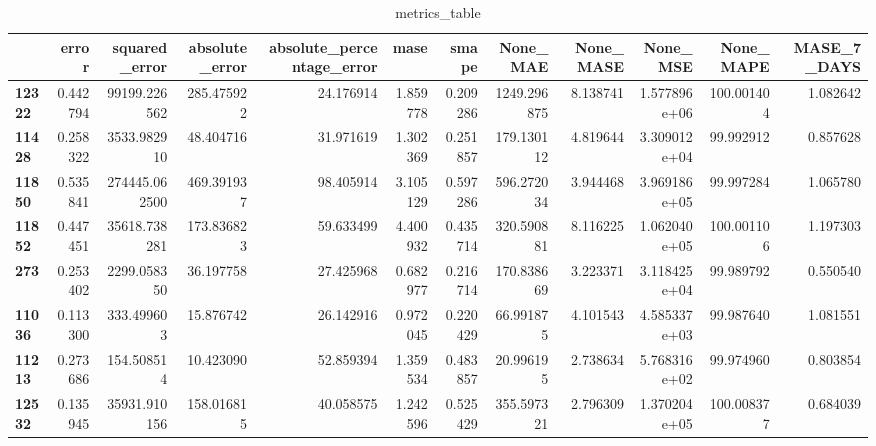 \begin{table}[h]
\centering
\caption{metrics_table}
\label{table:Final tune for dataset seasonal lstm local univariate, with differencing. After smape fix}
\begin{tabular}{lrrrrrrrrrrr}
\toprule
{} &     error &  squared\_error &  absolute\_error &  absolute\_percentage\_error &      mase &     smape &     None\_MAE &  None\_MASE &      None\_MSE &   None\_MAPE &  MASE\_7\_DAYS \\
\midrule
\textbf{12322} &  0.442794 &   99199.226562 &      285.475922 &                  24.176914 &  1.859778 &  0.209286 &  1249.296875 &   8.138741 &  1.577896e+06 &  100.001404 &     1.082642 \\
\textbf{11428} &  0.258322 &    3533.982910 &       48.404716 &                  31.971619 &  1.302369 &  0.251857 &   179.130112 &   4.819644 &  3.309012e+04 &   99.992912 &     0.857628 \\
\textbf{11850} &  0.535841 &  274445.062500 &      469.391937 &                  98.405914 &  3.105129 &  0.597286 &   596.272034 &   3.944468 &  3.969186e+05 &   99.997284 &     1.065780 \\
\textbf{11852} &  0.447451 &   35618.738281 &      173.836823 &                  59.633499 &  4.400932 &  0.435714 &   320.590881 &   8.116225 &  1.062040e+05 &  100.001106 &     1.197303 \\
\textbf{273  } &  0.253402 &    2299.058350 &       36.197758 &                  27.425968 &  0.682977 &  0.216714 &   170.838669 &   3.223371 &  3.118425e+04 &   99.989792 &     0.550540 \\
\textbf{11036} &  0.113300 &     333.499603 &       15.876742 &                  26.142916 &  0.972045 &  0.220429 &    66.991875 &   4.101543 &  4.585337e+03 &   99.987640 &     1.081551 \\
\textbf{11213} &  0.273686 &     154.508514 &       10.423090 &                  52.859394 &  1.359534 &  0.483857 &    20.996195 &   2.738634 &  5.768316e+02 &   99.974960 &     0.803854 \\
\textbf{12532} &  0.135945 &   35931.910156 &      158.016815 &                  40.058575 &  1.242596 &  0.525429 &   355.597321 &   2.796309 &  1.370204e+05 &  100.008377 &     0.684039 \\
\bottomrule
\end{tabular}
\end{table}
